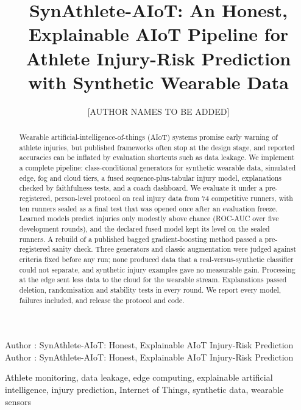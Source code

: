 \documentclass{ieeeaccess}
\begin{document}

\title{SynAthlete-AIoT: An Honest, Explainable AIoT Pipeline for Athlete Injury-Risk
Prediction with Synthetic Wearable Data}
\author{\uppercase{[Author names to be added]}}
\address[1]{[Department], SRM Institute of Science and Technology, India}

\markboth
{Author \headeretal: SynAthlete-AIoT: Honest, Explainable AIoT Injury-Risk Prediction}
{Author \headeretal: SynAthlete-AIoT: Honest, Explainable AIoT Injury-Risk Prediction}


\begin{abstract}
Wearable artificial-intelligence-of-things (AIoT) systems promise early warning of athlete
injuries, but published frameworks often stop at the design stage, and reported accuracies can
be inflated by evaluation shortcuts such as data leakage. We implement a complete pipeline:
class-conditional generators for synthetic wearable data, simulated edge, fog and cloud tiers,
a fused sequence-plus-tabular injury model, explanations checked by faithfulness tests, and a
coach dashboard. We evaluate it under a pre-registered, person-level protocol on real injury
data from 74 competitive runners, with ten runners sealed as a final test that was opened once
after an evaluation freeze. Learned models predict injuries only modestly above chance
(ROC-AUC \injuryAucRange{} over five development rounds), and the declared fused model kept
its level on the sealed runners. A rebuild of a published bagged gradient-boosting method passed
a pre-registered sanity check. Three generators and classic augmentation were judged against
criteria fixed before any run; none produced data that a real-versus-synthetic classifier could
not separate, and synthetic injury examples gave no measurable gain. Processing at the edge sent
\tiersReduction{} less data to the cloud for the wearable stream. Explanations passed deletion,
randomisation and stability tests in every round. We report every model, failures included,
and release the protocol and code.
\end{abstract}

\begin{keywords}
Athlete monitoring, data leakage, edge computing, explainable artificial intelligence,
injury prediction, Internet of Things, synthetic data, wearable sensors
\end{keywords}
\end{document}
